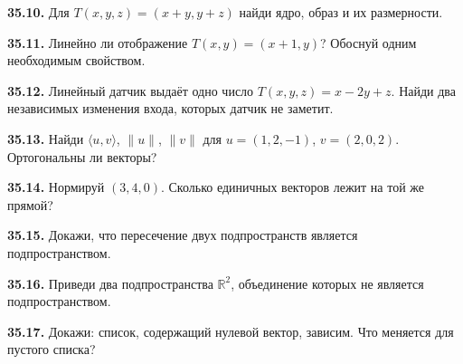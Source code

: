 \noindent\begin{minipage}[t]{\linewidth}\textbf{35.10.} Для \(T(x,y,z)=(x+y,y+z)\) найди ядро, образ и их размерности.\par\end{minipage}\par
\noindent\begin{minipage}[t]{\linewidth}\textbf{35.11.} Линейно ли отображение \(T(x,y)=(x+1,y)\)? Обоснуй одним необходимым свойством.\par\end{minipage}\par
\noindent\begin{minipage}[t]{\linewidth}\textbf{35.12.} Линейный датчик выдаёт одно число \(T(x,y,z)=x-2y+z\). Найди два независимых изменения входа, которых датчик не заметит.\par\end{minipage}\par
\noindent\begin{minipage}[t]{\linewidth}\textbf{35.13.} Найди \(\langle u,v\rangle\), \(\|u\|\), \(\|v\|\) для \(u=(1,2,-1)\), \(v=(2,0,2)\). Ортогональны ли векторы?\par\end{minipage}\par
\noindent\begin{minipage}[t]{\linewidth}\textbf{35.14.} Нормируй \((3,4,0)\). Сколько единичных векторов лежит на той же прямой?\par\end{minipage}\par
\noindent\begin{minipage}[t]{\linewidth}\textbf{35.15.} Докажи, что пересечение двух подпространств является подпространством.\par\end{minipage}\par
\noindent\begin{minipage}[t]{\linewidth}\textbf{35.16.} Приведи два подпространства \(\mathbb R^2\), объединение которых не является подпространством.\par\end{minipage}\par
\noindent\begin{minipage}[t]{\linewidth}\textbf{35.17.} Докажи: список, содержащий нулевой вектор, зависим. Что меняется для пустого списка?\par\end{minipage}\par
